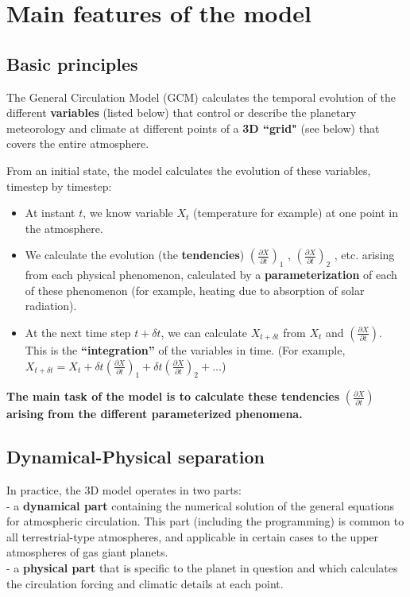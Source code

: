 \chapter{Main features of the model}

\label{sc:apercu}

\section{Basic principles}
The General Circulation Model (GCM) calculates the temporal evolution of
the different {\bf variables} (listed below)
that control or describe the planetary meteorology and climate
at different points of a {\bf 3D ``grid" } (see below) that covers
the entire  atmosphere.

From an initial state, the model calculates the evolution of these variables,
timestep by timestep:
\begin{itemize}
\item At instant $t$, we know variable $X_t$ (temperature for example)
at one point in the atmosphere.

\item We calculate the evolution (the {\bf tendencies})
$(\frac{\partial X}{\partial t})_1$ ,
$(\frac{\partial X}{\partial t})_2$ , etc.
arising from each physical phenomenon,
calculated by a {\bf parameterization} of each of these phenomenon
(for example, heating due to absorption of solar radiation).

\item At the next time step $t + \delta t$, we can calculate $X_{t+ \delta t}$
from  $X_t$ and $(\frac{\partial X}{\partial t})$.
This is the {\bf``integration''} of the variables in time.
(For example, $X_{t+ \delta t}=X_t +
 \delta t(\frac{\partial X}{\partial t})_1 +
 \delta t(\frac{\partial X}{\partial t})_2 + ...$)

\end{itemize}

{\bf The main task of the model is to calculate these tendencies}
$(\frac{\partial X}{\partial t})$
{\bf arising from the different parameterized phenomena.}

\section{Dynamical-Physical separation}

In practice, the 3D model operates in two parts:\\
- a {\bf dynamical part} containing the numerical solution of
the general equations for atmospheric circulation.
This part (including the programming) is common to all terrestrial-type atmospheres, and applicable
in certain cases to the upper atmospheres of gas giant planets.\\
- a {\bf physical part} that is specific to the planet in question and
which calculates the circulation forcing and climatic details at each point.

